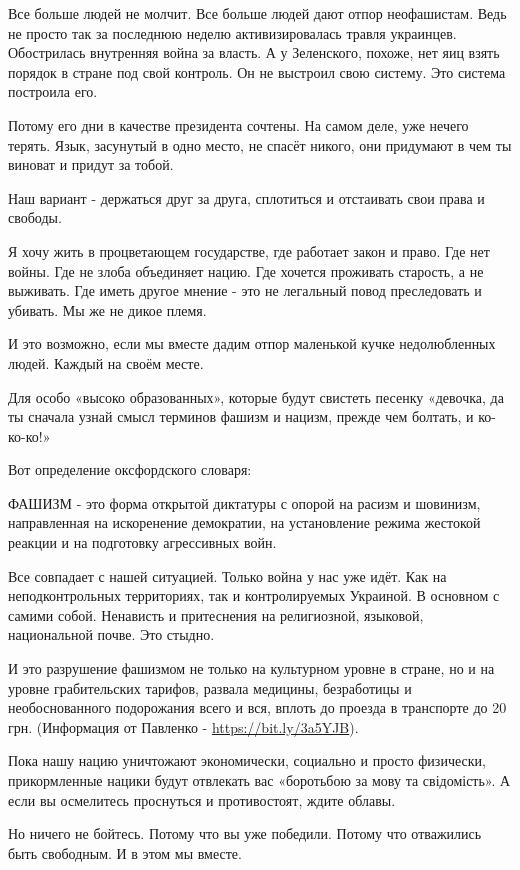  Все больше людей не молчит. Все больше людей дают отпор неофашистам. Ведь не
 просто так за последнюю неделю активизировалась травля украинцев. Обострилась
 внутренняя война за власть. А у Зеленского, похоже, нет яиц взять порядок в
 стране под свой контроль. Он не выстроил свою систему. Это система построила
 его.

Потому его дни в качестве президента сочтены. На самом деле, уже нечего терять.
Язык, засунутый в одно место, не спасёт никого, они придумают в чем ты виноват
и придут за тобой. 

Наш вариант - держаться друг за друга, сплотиться и отстаивать свои права и
свободы.

 Я хочу жить в процветающем государстве, где работает закон и право. Где нет
 войны. Где не злоба объединяет нацию. Где хочется проживать старость, а не
 выживать. Где иметь другое мнение - это не легальный повод преследовать и
 убивать. Мы же не дикое племя. 

И это возможно, если мы вместе дадим отпор маленькой кучке недолюбленных людей.
Каждый на своём месте. 

Для особо «высоко образованных», которые будут свистеть песенку «девочка, да ты
сначала узнай смысл терминов фашизм и нацизм, прежде чем болтать, и ко-ко-ко!» 

Вот определение оксфордского словаря: 

ФАШИЗМ - это форма открытой диктатуры с опорой на расизм и шовинизм,
направленная на искоренение демократии, на установление режима жестокой реакции
и на подготовку агрессивных войн. 

Все совпадает с нашей ситуацией. Только война у нас уже идёт. Как на
неподконтрольных территориях, так и контролируемых Украиной. В основном с
самими собой. Ненависть и притеснения на религиозной, языковой, национальной
почве. Это стыдно.

И это разрушение фашизмом не только на культурном уровне в стране, но и на
уровне грабительских тарифов, развала медицины, безработицы и необоснованного
подорожания всего и вся, вплоть до проезда в транспорте до 20 грн. (Информация
от Павленко - \url{https://bit.ly/3a5YJB}).

Пока нашу нацию уничтожают экономически, социально и просто физически,
прикормленные нацики будут отвлекать вас «боротьбою за мову та свідомість». А
если вы осмелитесь проснуться и противостоят, ждите облавы.

Но ничего не бойтесь. Потому что вы уже победили. Потому что отважились быть
свободным. И в этом мы вместе.

